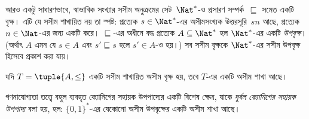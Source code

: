 \documentclass[../../../include/open-logic-section]{subfiles}
\begin{document}
\begin{ex}
আরও একটু সাধারণভাবে, স্বাভাবিক সংখ্যার সসীম অনুক্রমের সেট~$\Nat^*$-ও প্রসারণ সম্পর্ক~$\sqsubseteq$ সমেত একটি বৃক্ষ। এটি যে সসীম শাখায়িত নয় তা স্পষ্ট: প্রত্যেক $s \in \Nat^*$-এর অসীমসংখ্যক উত্তরসূরি~$sn$ আছে, প্রত্যেক $n \in \Nat$-এর জন্য একটি করে। $\sqsubseteq$-এর অধীনে বদ্ধ প্রত্যেক $A \subseteq \Nat^*$ হল $\Nat^*$-এর একটি \emph{উপবৃক্ষ}। (অর্থাৎ $A$ এমন যে $s \in A$ এবং $s' \sqsubseteq s$ হলে $s' \in A$-ও হয়।) সব সসীম বৃক্ষকে $\Nat^*$-এর সসীম উপবৃক্ষ হিসেবে প্রকাশ করা যায়।
\end{ex}

\begin{prop}[ক্যোনিগের সহায়ক উপপাদ্য]
যদি $T = \tuple{A,\le}$ একটি সসীম শাখায়িত অসীম বৃক্ষ হয়, তবে $T$-এর একটি অসীম শাখা আছে।
\end{prop}

গণনাযোগ্যতা তত্ত্বে বহুল ব্যবহৃত ক্যোনিগের সহায়ক উপপাদ্যের একটি বিশেষ ক্ষেত্র, যাকে \emph{দুর্বল ক্যোনিগের সহায়ক উপপাদ্য} বলা হয়, হল: $\{0,1\}^*$-এর যেকোনো অসীম উপবৃক্ষের একটি অসীম শাখা আছে।
\end{document}
